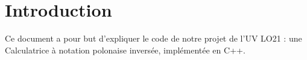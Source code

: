 \hypertarget{index_Introduction}{}\section{Introduction}\label{index_Introduction}
Ce document a pour but d'expliquer le code de notre projet de l'U\-V L\-O21 \-: une Calculatrice à notation polonaise inversée, implémentée en C++. 